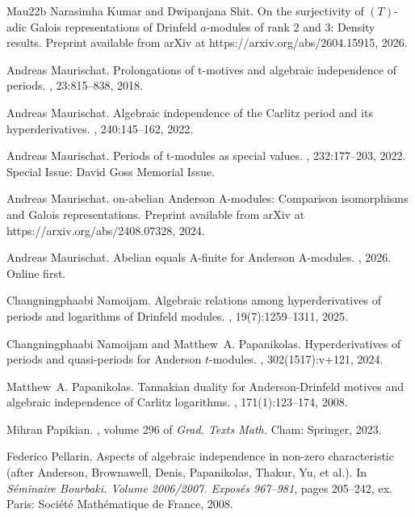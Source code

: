 \documentclass[10pt,a4paper]{amsart}
\theoremstyle{plain} %
\theoremstyle{definition}
\theoremstyle{remark}
\numberwithin{equation}{subsection}
\begin{document}
\begin{thebibliography}{Mau22b}
Narasimha Kumar and Dwipanjana Shit.
\newblock On the surjectivity of {$(T)$}-adic {G}alois representations of
  {D}rinfeld $a$-modules of rank 2 and 3: Density results.
\newblock Preprint available from arXiv at https://arxiv.org/abs/2604.15915,
  2026.

Andreas Maurischat.
\newblock Prolongations of t-motives and algebraic independence of periods.
, 23:815--838, 2018.

Andreas Maurischat.
\newblock Algebraic independence of the {C}arlitz period and its
  hyperderivatives.
, 240:145--162, 2022.

Andreas Maurischat.
\newblock Periods of t-modules as special values.
, 232:177--203, 2022.
\newblock Special Issue: David Goss Memorial Issue.

Andreas Maurischat.
on-abelian {A}nderson {A}-modules: {C}omparison isomorphisms and
  {G}alois representations.
\newblock Preprint available from arXiv at https://arxiv.org/abs/2408.07328,
  2024.

Andreas Maurischat.
\newblock Abelian equals {A-finite} for {Anderson} {A-modules}.
, 2026.
\newblock Online first.

Changningphaabi Namoijam.
\newblock Algebraic relations among hyperderivatives of periods and logarithms
  of {D}rinfeld modules.
, 19(7):1259--1311, 2025.

Changningphaabi Namoijam and Matthew~A. Papanikolas.
\newblock Hyperderivatives of periods and quasi-periods for {A}nderson
  {$t$}-modules.
, 302(1517):v+121, 2024.

Matthew~A. Papanikolas.
\newblock Tannakian duality for {A}nderson-{D}rinfeld motives and algebraic
  independence of {C}arlitz logarithms.
, 171(1):123--174, 2008.

Mihran Papikian.
, volume 296 of {\em Grad. Texts Math.}
\newblock Cham: Springer, 2023.

Federico Pellarin.
\newblock Aspects of algebraic independence in non-zero characteristic (after
  {Anderson}, {Brownawell}, {Denis}, {Papanikolas}, {Thakur}, {Yu}, et al.).
\newblock In {\em S\'eminaire Bourbaki. Volume 2006/2007. Expos\'es 967--981},
  pages 205--242, ex. Paris: Soci{\'e}t{\'e} Math{\'e}matique de France, 2008.


\end{thebibliography}
\end{document}
